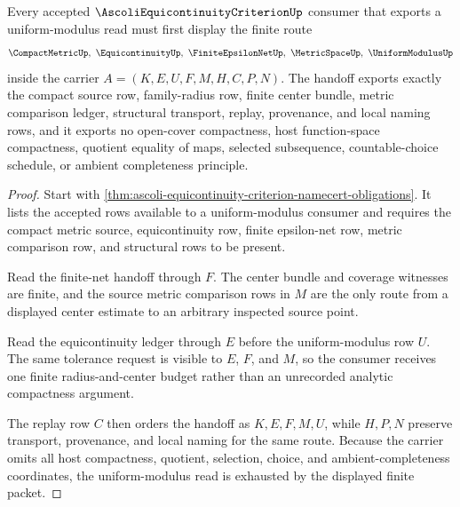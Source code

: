\begin{theorem}
\label{thm:ascoli-equicontinuity-criterion-finite-net-handoff}
Every accepted $\AscoliEquicontinuityCriterionUp$ consumer that exports a uniform-modulus read must first display the finite route
$$
\CompactMetricUp,\ \EquicontinuityUp,\ \FiniteEpsilonNetUp,\ \MetricSpaceUp,\ \UniformModulusUp
$$
inside the carrier $A=(K,E,U,F,M,H,C,P,N)$. The handoff exports exactly the compact source row, family-radius row, finite center bundle, metric comparison ledger, structural transport, replay, provenance, and local naming rows, and it exports no open-cover compactness, host function-space compactness, quotient equality of maps, selected subsequence, countable-choice schedule, or ambient completeness principle.
\end{theorem}
\begin{proof}
Start with \autoref{thm:ascoli-equicontinuity-criterion-namecert-obligations}. It lists the accepted rows available to a uniform-modulus consumer and requires the compact metric source, equicontinuity row, finite epsilon-net row, metric comparison row, and structural rows to be present.

Read the finite-net handoff through $F$. The center bundle and coverage witnesses are finite, and the source metric comparison rows in $M$ are the only route from a displayed center estimate to an arbitrary inspected source point.

Read the equicontinuity ledger through $E$ before the uniform-modulus row $U$. The same tolerance request is visible to $E$, $F$, and $M$, so the consumer receives one finite radius-and-center budget rather than an unrecorded analytic compactness argument.

The replay row $C$ then orders the handoff as $K,E,F,M,U$, while $H,P,N$ preserve transport, provenance, and local naming for the same route. Because the carrier omits all host compactness, quotient, selection, choice, and ambient-completeness coordinates, the uniform-modulus read is exhausted by the displayed finite packet.
\end{proof}



